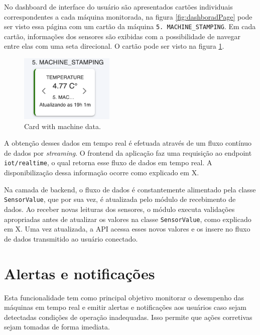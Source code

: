 No dashboard de interface do usuário são apresentados cartões individuais correspondentes a cada máquina monitorada, na figura \ref{fig:dashboradPage} pode ser visto essa página com um cartão da máquina \texttt{5. MACHINE\_STAMPING}. Em cada cartão, informações dos sensores são exibidas com a possibilidade de navegar entre elas com uma seta direcional. O cartão pode ser visto na figura \ref{fig:cardData}.

\begin{figure}[htbp]
	\centering
	\includegraphics[width=0.4\textwidth]{images/machineCard.png}
	\caption{Card with machine data.}
	\label{fig:cardData}
\end{figure}

A obtenção desses dados em tempo real é efetuada através de um fluxo contínuo de dados por \textit{streaming}. O frontend da aplicação faz uma requisição ao endpoint \texttt{iot/realtime}, o qual retorna esse fluxo de dados em tempo real. A disponibilização dessa informação ocorre como explicado em X. 

Na camada de backend, o fluxo de dados é constantemente alimentado pela classe \texttt{SensorValue}, que por sua vez, é atualizada pelo módulo de recebimento de dados. Ao receber novas leituras dos sensores, o módulo executa validações apropriadas antes de atualizar os valores na classe \texttt{SensorValue}, como explicado em X. Uma vez atualizada, a \gls{API} acessa esses novos valores e os insere no fluxo de dados transmitido ao usuário conectado.


\section[Alertas e notificações]{Alertas e notificações}\label{sec:alertsAndNotifications}

Esta funcionalidade tem como principal objetivo monitorar o desempenho das máquinas em tempo real e emitir alertas e notificações aos usuários caso sejam detectadas condições de operação inadequadas. Isso permite que ações corretivas sejam tomadas de forma imediata.

